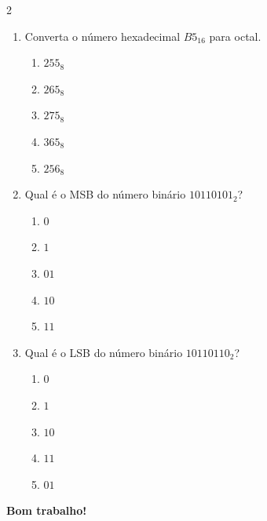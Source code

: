 \documentclass[a4paper,12pt]{article}
\begin{document}
\begin{multicols}{2}
\begin{enumerate}[leftmargin=*]
\vspace{0.2cm}

\item Converta o número hexadecimal $B5_{16}$ para octal.

\begin{enumerate}[label=(\Alph*)]
    \item $255_8$
    \item $265_8$
    \item $275_8$
    \item $365_8$
    \item $256_8$
\end{enumerate}

\vspace{0.2cm}


\item Qual é o MSB do número binário $10110101_2$?

\begin{enumerate}[label=(\Alph*)]
    \item $0$
    \item $1$
    \item $01$
    \item $10$
    \item $11$
\end{enumerate}

\vspace{0.2cm}

\item Qual é o LSB do número binário $10110110_2$?

\begin{enumerate}[label=(\Alph*)]
    \item $0$
    \item $1$
    \item $10$
    \item $11$
    \item $01$
\end{enumerate}

\end{enumerate}

\end{multicols}

\vfill

\begin{center}
\textbf{Bom trabalho!}
\end{center}
\end{document}
